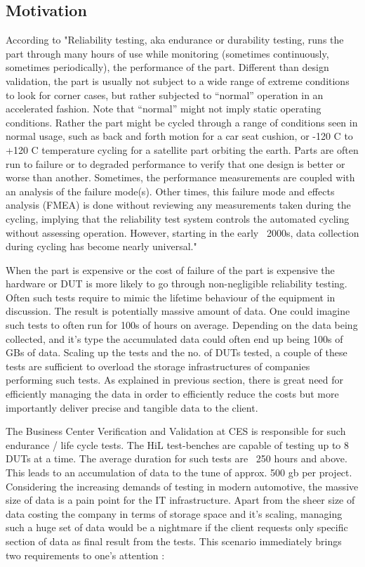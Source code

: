 \subsection{Motivation}
According to \cite{viewpoint} "Reliability testing, aka endurance or durability testing, runs the part through many hours of use while monitoring (sometimes continuously, sometimes periodically), the performance of the part. Different than design validation, the part is usually not subject to a wide range of extreme conditions to look for corner cases, but rather subjected to “normal” operation in an accelerated fashion. Note that “normal” might not imply static operating conditions. Rather the part might be cycled through a range of conditions seen in normal usage, such as back and forth motion for a car seat cushion, or -120 C to +120 C temperature cycling for a satellite part orbiting the earth. Parts are often run to failure or to degraded performance to verify that one design is better or worse than another. Sometimes, the performance measurements are coupled with an analysis of the failure mode(s). Other times, this failure mode and effects analysis (FMEA) is done without reviewing any measurements taken during the cycling, implying that the reliability test system controls the automated cycling without assessing operation. However, starting in the early ~2000s, data collection during cycling has become nearly universal."

When the part is expensive or the cost of failure of the part is expensive the hardware or DUT is more likely to go through non-negligible reliability testing. Often such tests require to mimic the lifetime behaviour of the equipment in discussion. The result is potentially massive amount of data. One could imagine such tests to often run for 100s of hours on average. Depending on the data being collected, and it's type the accumulated data could often end up being 100s of GBs of data. Scaling up the tests and the no. of DUTs tested, a couple of these tests are sufficient to overload the storage infrastructures of companies performing such tests. As explained in previous section, there is great need for efficiently managing the data in order to efficiently reduce the costs but more importantly deliver precise and tangible data to the client.

The Business Center Verification and Validation at CES is responsible for such endurance / life cycle tests. The HiL test-benches are capable of testing up to 8 DUTs at a time. The average duration for such tests are ~250 hours and above. This leads to an accumulation of data to the tune of approx. 500 gb per project. Considering the increasing demands of testing in modern automotive, the massive size of data is a pain point for the IT infrastructure. Apart from the sheer size of data costing the company in terms of storage space and it's scaling, managing such a huge set of data would be a nightmare if the client requests only specific section of data as final result from the tests. This scenario immediately brings two requirements to one's attention :

